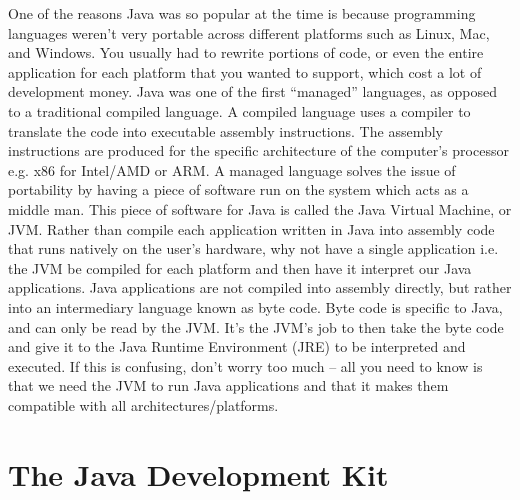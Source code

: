 \documentclass{article}
\begin{document}
One of the reasons Java was so popular at the time is because programming languages weren’t very portable
across different platforms such as Linux, Mac, and Windows. You usually had to rewrite portions of code, or
even the entire application for each platform that you wanted to support, which cost a lot of development
money. Java was one of the first “managed” languages, as opposed to a traditional compiled language. A
compiled language uses a compiler to translate the code into executable assembly instructions. The assembly
instructions are produced for the specific architecture of the computer’s processor e.g. x86 for Intel/AMD or
ARM. A managed language solves the issue of portability by having a piece of software run on the system which
acts as a middle man. This piece of software for Java is called the Java Virtual Machine, or JVM. Rather than
compile each application written in Java into assembly code that runs natively on the user’s hardware, why not
have a single application i.e. the JVM be compiled for each platform and then have it interpret our Java
applications. Java applications are not compiled into assembly directly, but rather into an intermediary
language known as byte code. Byte code is specific to Java, and can only be read by the JVM. It’s the JVM’s
job to then take the byte code and give it to the Java Runtime Environment (JRE) to be interpreted and executed.
If this is confusing, don’t worry too much – all you need to know is that we need the JVM to run Java
applications and that it makes them compatible with all architectures/platforms.

\section{The Java Development Kit}
\end{document}

